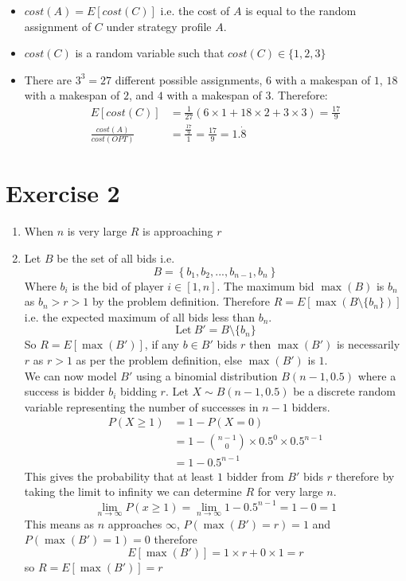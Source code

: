 \documentclass[]{article}
\begin{document}
\begin{enumerate}
\begin{itemize}
		\item
		$cost(A)=E[cost(C)]$ i.e. the cost of $A$ is equal to the random assignment of $C$ under strategy profile $A$.
		\item
		$cost(C)$ is a random variable such that $cost(C)\in\{1,2,3\}$
		\item
		There are $3^3=27$ different possible assignments, $6$ with a makespan of $1$, $18$ with a makespan of $2$, and $4$ with a makespan of $3$. Therefore:
		\begin{align*}
			E[cost(C)]&=\frac{1}{27}(6\times1+18\times2+3\times3)=\frac{17}{9} \\
			\frac{cost(A)}{cost(OPT)}&=\frac{\frac{17}{9}}{1}=\frac{17}{9}=1.\dot{8}
		\end{align*}
	\end{itemize}
\end{enumerate}

\section*{Exercise 2}
\begin{enumerate}
	\item When $n$ is very large $R$ is approaching $r$
	\item
	Let $B$ be the set of all bids i.e. 
	\[B=\left\{b_1,b_2,...,b_{n-1},b_n \right\}\]
	Where $b_i$ is the bid of player $i \in [1,n]$.
	The maximum bid $\max(B)$ is $b_n$ as $b_n > r > 1$ by the problem definition.
	Therefore $R=E[\max(B\setminus\{b_n\})]$ i.e. the expected maximum of all bids less than $b_n$.
	\[
	\text{Let}\ B'=B\setminus\{b_n\}
	\]
	So $R=E[\max(B')]$, if any $b\in B'$ bids $r$ then $\max(B')$ is necessarily $r$ as $r>1$ as per the problem definition, else $\max(B')$ is $1$.\\
	We can now model $B'$ using a binomial distribution $B(n-1, 0.5)$ where a success is bidder $b_i$ bidding $r$. Let $X\sim B(n-1,0.5)$ be a discrete random variable representing the number of successes in $n-1$ bidders.
	\begin{align*}
		P(X\geq 1) &= 1-P(X=0) \\
		&= 1-\binom{n-1}{0}\times0.5^0\times0.5^{n-1} \\
		&= 1-0.5^{n-1}
	\end{align*}
This gives the probability that at least $1$ bidder from $B'$ bids $r$ therefore by taking the limit to infinity we can determine $R$ for very large $n$.
\[
\lim_{n \to \infty}  P(x\geq 1) = \lim_{n \to \infty} 1-0.5^{n-1} = 1-0 = 1
\]
This means as $n$ approaches $\infty$, $P(\max(B')=r)=1$ and $P(\max(B')=1)=0$ therefore
\[
	E[\max(B')]=1\times r + 0 \times 1 = r
\]
so $R=E[\max(B')] = r$
\end{enumerate}
\end{document}
